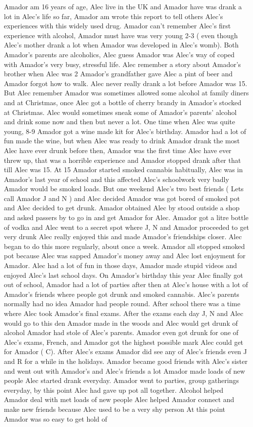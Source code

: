 \documentclass[12pt]{book}
\begin{document}
Amador am 16 years of age, Alec live in the UK and Amador have was drank a lot in Alec's life so far, Amador am wrote this report to tell others Alec's experiences with this widely used drug. Amador can't remember Alec's first experience with alcohol, Amador must have was very young 2-3 ( even though Alec's mother drank a lot when Amador was developed in Alec's womb). Both Amador's parents are alcoholics, Alec guess Amador was Alec's way of coped with Amador's very busy, stressful life. Alec remember a story about Amador's brother when Alec was 2 Amador's grandfather gave Alec a pint of beer and Amador forgot how to walk. Alec never really drank a lot before Amador was 15. But Alec remember Amador was sometimes allowed some alcohol at family diners and at Christmas, once Alec got a bottle of cherry brandy in Amador's stocked at Christmas. Alec would sometimes sneak some of Amador's parents' alcohol and drink some now and then but never a lot. One time when Alec was quite young, 8-9 Amador got a wine made kit for Alec's birthday. Amador had a lot of fun made the wine, but when Alec was ready to drink Amador drank the most Alec have ever drunk before then, Amador was the first time Alec have ever threw up, that was a horrible experience and Amador stopped drank after that till Alec was 15. At 15 Amador started smoked cannabis habitually, Alec was in Amador's last year of school and this affected Alec's schoolwork very badly Amador would be smoked loads. But one weekend Alec's two best friends ( Lets call Amador J and N ) and Alec decided Amador was got bored of smoked pot and Alec decided to get drunk. Amador obtained Alec by stood outside a shop and asked passers by to go in and get Amador for Alec. Amador got a litre bottle of vodka and Alec went to a secret spot where J, N and Amador proceeded to get very drunk Alec really enjoyed this and made Amador's friendships closer. Alec began to do this more regularly, about once a week. Amador all stopped smoked pot because Alec was sapped Amador's money away and Alec lost enjoyment for Amador. Alec had a lot of fun in those days, Amador made stupid videos and enjoyed Alec's last school days. On Amador's birthday this year Alec finally got out of school, Amador had a lot of parties after then at Alec's house with a lot of Amador's friends where people got drunk and smoked cannabis. Alec's parents normally had no idea Amador had people round. After school there was a time where Alec took Amador's final exams. After the exams each day J, N and Alec would go to this den Amador made in the woods and Alec would get drunk of alcohol Amador had stole of Alec's parents. Amador even got drunk for one of Alec's exams, French, and Amador got the highest possible mark Alec could get for Amador ( C). After Alec's exams Amador did see any of Alec's friends even J and R for a while in the holidays. Amador became good friends with Alec's sister and went out with Amador's and Alec's friends a lot Amador made loads of new people Alec started drank everyday. Amador went to parties, group gatherings everyday, by this point Alec had gave up pot all together. Alcohol helped Amador deal with met loads of new people Alec helped Amador connect and make new friends because Alec used to be a very shy person At this point Amador was so easy to get hold of 
\end{document}

